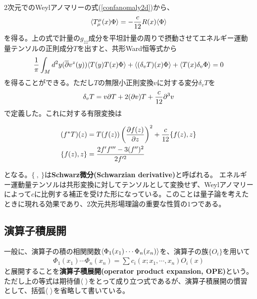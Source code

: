 $2$次元でのWeylアノマリーの式(\ref{confanomaly2d})から、
\begin{align}
\langle T^\mu_\mu(x) \Phi \rangle = -\frac{c}{12}R(x)\langle \Phi \rangle
\end{align}
を得る。上の式で計量の$g_{\overline{z}\overline{z}}$成分を平坦計量の周りで摂動させてエネルギー運動量テンソルの正則成分$T$を出すと、共形Ward恒等式から
\begin{align}\label{confwardEMtensor}
\frac{1}{\pi}\int_{M}d^2y (\overline{\partial}v^z(y))\langle  T(y)T(x)\Phi \rangle+\langle (\delta_v T)(x) \Phi \rangle+\langle T(x)\delta_v \Phi\rangle =0
\end{align}
を得ることができる。ただし$T$の無限小正則変換$v$に対する変分$\delta_v T$を
\begin{align}
\delta_v T=v \partial T+2(\partial v)T+\frac{c}{12}\partial^3 v
\end{align}
で定義した。これに対する有限変換は
\begin{oframed}
\begin{align}\label{transfofEmtensor}
(f^\ast T)(z)&=T(f(z))\left( \frac{\partial f(z)}{\partial z} \right)^{2}+\frac{c}{12}\{f(z),z\}\\
\{f(z),z\}&=\frac{2f'f'''-3(f'')^2}{2f'^2}
\end{align}
\end{oframed}
となる。$\{\ ,\ \}$は\textbf{Schwarz微分(Schwarzian derivative)}と呼ばれる。
エネルギー運動量テンソルは共形変換に対してテンソルとして変換せず、Weylアノマリーによって$c$に比例する補正を受けた形になっている。このことは量子論を考えたときに現れる効果であり、$2$次元共形場理論の重要な性質の$1$つである。

\subsection{演算子積展開}
一般に、演算子の積の相関関数$\langle\Phi_1(x_1)\cdots \Phi_n(x_n)\rangle$を、演算子の族$\{O_i\}$を用いて
\begin{align}
\Phi_1(x_1)\cdots \Phi_n(x_n)=\sum c_i(x;x_1,\cdots,x_n) O_i(x)
\end{align}
と展開することを\textbf{演算子積展開(operator product expansion, OPE)}という。ただし上の等式は期待値$\la \ \ra$をとって成り立つ式であるが、演算子積展開の慣習として、括弧$\la \ \ra$を省略して書いている。

